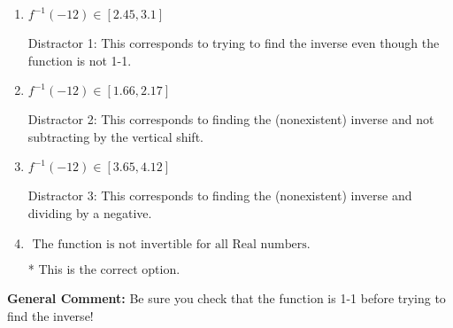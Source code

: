 \documentclass{extbook}[14pt]
\begin{document}
\begin{enumerate}
{\begin{enumerate}[label=\Alph*.]
 Distractor 4: This corresponds to both distractors 2 and 3.
\item \( f^{-1}(-12) \in [2.45, 3.1] \)

 Distractor 1: This corresponds to trying to find the inverse even though the function is not 1-1. 
\item \( f^{-1}(-12) \in [1.66, 2.17] \)

 Distractor 2: This corresponds to finding the (nonexistent) inverse and not subtracting by the vertical shift.
\item \( f^{-1}(-12) \in [3.65, 4.12] \)

 Distractor 3: This corresponds to finding the (nonexistent) inverse and dividing by a negative.
\item \( \text{ The function is not invertible for all Real numbers. } \)

* This is the correct option.
\end{enumerate}

\textbf{General Comment:} Be sure you check that the function is 1-1 before trying to find the inverse!
}
\end{enumerate}
\end{document}
